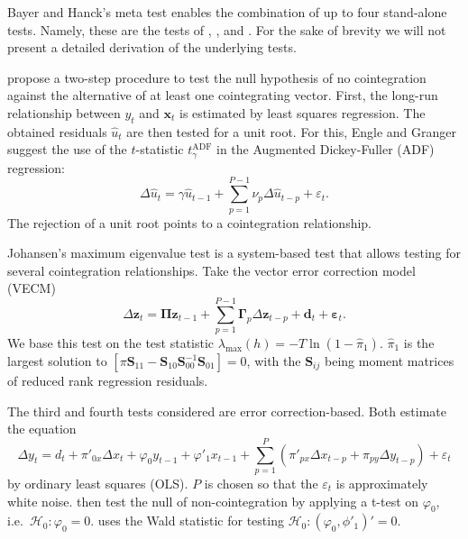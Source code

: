 \documentclass[12pt,a4paper]{article}
\begin{document}
Bayer and Hanck's meta test enables the combination of up to four
stand-alone tests. Namely, these are the tests of
\textcite{Englegranger_1987}, \textcite{Johansen_1988},
\textcite{Boswijk_1994} and \textcite{Banerjee_1998}. For the sake of
brevity we will not present a detailed derivation of the underlying
tests.

\textcite{Englegranger_1987} propose a two-step procedure to test the
null hypothesis of no cointegration against the alternative of at least
one cointegrating vector. First, the long-run relationship between
\(y_t\) and \(\mathbf{x}_t\) is estimated by least squares regression.
The obtained residuals \(\hat{u}_t\) are then tested for a unit root.
For this, Engle and Granger suggest the use of the \(t\)-statistic
\(t^{\text{ADF}}_\gamma\) in the Augmented Dickey-Fuller (ADF)
regression: \begin{equation}
\Delta \hat{u}_t = \gamma \hat{u}_{t-1} + \sum^{P-1}_{p=1} \nu_p \Delta \hat{u}_{t-p} + \varepsilon_t.
\label{eq:2}
\end{equation} The rejection of a unit root points to a cointegration
relationship.

Johansen's \autocite*{Johansen_1988} maximum eigenvalue test is a
system-based test that allows testing for several cointegration
relationships. Take the vector error correction model (VECM)
\begin{equation}
\Delta \mathbf{z}_t = \mathbf{\Pi z}_{t-1} + \sum^{P-1}_{p = 1} \mathbf{\Gamma}_p \Delta \mathbf{z}_{t-p} + \mathbf{d}_t + \mathbf{\varepsilon}_t.
\label{eq:3}
\end{equation} We base this test on the test statistic
\(\lambda_{\text{max}}(h) = -T \ln(1 - \hat{\pi}_1)\). \(\hat{\pi}_1\)
is the largest solution to
\([\pi \mathbf{S}_{11} - \mathbf{S}_{10} \mathbf{S}_{00}^{-1}\mathbf{S}_{01}] = 0\),
with the \(\mathbf{S}_{ij}\) being moment matrices of reduced rank
regression residuals.

The third and fourth tests considered are error correction-based. Both
estimate the equation \begin{equation}
\Delta y_t = d_t + \pi'_{0x} \Delta x_t + \varphi_0 y_{t-1} + \varphi'_1 x_{t-1} + \sum^P_{p=1} (\pi'_{px} \Delta x_{t-p} + \pi_{py} \Delta y_{t-p}) + \varepsilon_t
\label{eq:4}
\end{equation} by ordinary least squares (OLS). \(P\) is chosen so that
the \(\varepsilon_t\) is approximately white noise.
\textcite{Banerjee_1998} then test the null of non-cointegration by
applying a t-test on \(\varphi_0\),
i.e.~\(\mathcal{H}_0 : \varphi_0 = 0\). \textcite{Boswijk_1994} uses the
Wald statistic for testing
\(\mathcal{H}_0 : (\varphi_0, \phi'_1)' = 0\).
\end{document}
